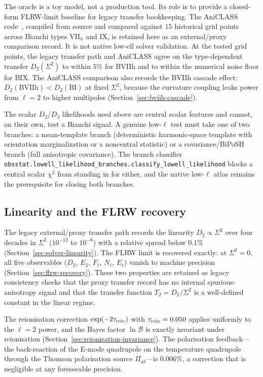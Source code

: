The oracle is a toy model, not a production tool.  Its
role is to provide a closed-form FLRW-limit baseline for
legacy transfer bookkeeping.  The AniCLASS
code~\cite{VicentePereiraPitrou2026}, compiled from source
and compared against $15$ historical grid points across
Bianchi types VII$_h$ and IX, is retained here as an
external/proxy comparison record.  It is not native low-ell
solver validation.  At the tested grid points, the legacy
transfer path and AniCLASS agree on the type-dependent
transfer $D_2(\Sigma^2)$ to within $5\%$ for BVIIh and to
within the numerical noise floor for BIX.  The AniCLASS
comparison also records the BVIIh cascade effect:
$D_2(\mathrm{BVIIh}) < D_2(\mathrm{BI})$ at fixed
$\Sigma^2$, because the curvature coupling leaks power
from $\ell = 2$ to higher multipoles
(Section~\ref{sec:bviih-cascade}).

The scalar $D_2$/$D_3$ likelihoods used above are central scalar
features and cannot, on their own, test a Bianchi signal.  A
genuine low-$\ell$ test must take one of two branches: a
mean-template branch (deterministic harmonic-space template with
orientation marginalization or a noncentral statistic) or a
covariance/BiPoSH branch (full anisotropic covariance).  The
branch classifier
\texttt{obsstat.lowell\_likelihood\_branches.classify\_lowell\_likelihood}
blocks a central scalar $\chi^2$ from standing in for either, and
the native low-$\ell$ atlas remains the prerequisite for closing
both branches.


\subsection{Linearity and the FLRW recovery}
\label{sec:disc-linearity}

The legacy external/proxy transfer path records the linearity
$D_2 \propto \Sigma^2$ over four decades in $\Sigma^2$
($10^{-12}$ to $10^{-6}$) with a relative spread below $0.1\%$
(Section~\ref{sec:solver-linearity}).  The FLRW limit is
recovered exactly: at $\Sigma^2 = 0$, all five
observables ($D_2$, $E_2$, $F_\ell$, $N_\ell$, $E_\ell$)
vanish to machine precision
(Section~\ref{sec:flrw-recovery}).  These two properties are
retained as legacy consistency checks that the proxy transfer
record has no internal spurious-anisotropy signal and that the
transfer function $T_2 = D_2 / \Sigma^2$ is a well-defined
constant in the linear regime.

The reionisation correction $\exp(-2\tau_{\rm reio})$
with $\tau_{\rm reio} = 0.050$ applies uniformly to the
$\ell = 2$ power, and the Bayes factor $\ln \mathcal{B}$
is exactly invariant under reionisation
(Section~\ref{sec:reionisation-invariance}).  The
polarisation feedback---the back-reaction of the E-mode
quadrupole on the temperature quadrupole through the
Thomson polarisation source $\Pi_{ab}$---is $0.006\%$, a
correction that is negligible at any foreseeable precision.


